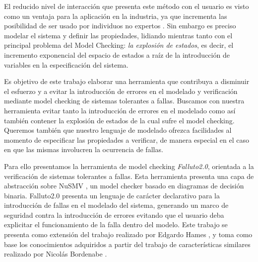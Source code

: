 \documentclass[pdftex,a4paper,12pt]{book}
\begin{document}
El reducido nivel de interacci\'on que presenta este m\'etodo con el usuario es visto como un ventaja para la aplicaci\'on en la industria, ya que incrementa las posibilidad de ser usado por individuos no expertos \cite{RuysBrinksma}.
Sin embargo es preciso modelar el sistema y definir las propiedades, lidiando mientras tanto con el principal problema del Model Checking: \emph{la explosi\'on de estados}, es decir, el incremento exponencial del espacio de estados a ra\'iz de la introducci\'on de variables en la especificaci\'on del sistema.


Es objetivo de este trabajo elaborar una herramienta que contribuya a disminuir el esfuerzo y a evitar la introducci\'on de errores en el modelado y verificaci\'on mediante model checking de sistemas tolerantes a fallas. Buscamos con nuestra herramienta evitar tanto la introducci\'on de errores en el modelado como as\'i tambi\'en contener la explosi\'on de estados de la cual sufre el model checking. Queremos tambi\'en que nuestro lenguaje de modelado ofrezca facilidades al momento de especificar las propiedades a verificar, de manera especial en el caso en que las mismas involucren la ocurrencia de fallas.

Para ello presentamos la herramienta de model checking \emph{Falluto2.0}, o\-rien\-ta\-da a la verificaci\'on de sistemas tolerantes a fallas. Esta herramienta presenta una capa de abstracci\'on sobre NuSMV \cite{NuSMV}, un model checker basado en diagramas de decisi\'on binaria. Falluto2.0 presenta un lenguaje de car\'acter declarativo para la introducci\'on de fallas en el modelado del sistema, generando un marco de seguridad contra la introducci\'on de errores evitando que el usuario deba explicitar el funcionamiento de la falla dentro del modelo. Este trabajo se presenta como extensi\'on del trabajo realizado por Edgardo Hames \cite{Hames}, y toma como base los conocimientos adquiridos a partir del trabajo de caracter\'isticas similares realizado por Nicol\'as Bordenabe \cite{Bordenabe}.
\end{document}

